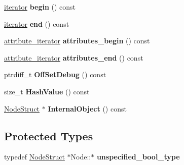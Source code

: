 \begin{DoxyCompactItemize}
\item 
\hypertarget{classphys_1_1xml_1_1Node_a78c82f35dcf7b2c37f1f5ff37d526329}{
\hyperlink{classphys_1_1xml_1_1NodeIterator}{iterator} {\bfseries begin} () const }
\label{d7/d0a/classphys_1_1xml_1_1Node_a78c82f35dcf7b2c37f1f5ff37d526329}

\item 
\hypertarget{classphys_1_1xml_1_1Node_ae69ca8be6e9eb53a4faf8bb50a2996d6}{
\hyperlink{classphys_1_1xml_1_1NodeIterator}{iterator} {\bfseries end} () const }
\label{d7/d0a/classphys_1_1xml_1_1Node_ae69ca8be6e9eb53a4faf8bb50a2996d6}

\item 
\hypertarget{classphys_1_1xml_1_1Node_a601285bed116eb5d63cea9a8d117e5b7}{
\hyperlink{classphys_1_1xml_1_1AttributeIterator}{attribute\_\-iterator} {\bfseries attributes\_\-begin} () const }
\label{d7/d0a/classphys_1_1xml_1_1Node_a601285bed116eb5d63cea9a8d117e5b7}

\item 
\hypertarget{classphys_1_1xml_1_1Node_a9af9e0bff5b8ed06bc40861dccb6b4ec}{
\hyperlink{classphys_1_1xml_1_1AttributeIterator}{attribute\_\-iterator} {\bfseries attributes\_\-end} () const }
\label{d7/d0a/classphys_1_1xml_1_1Node_a9af9e0bff5b8ed06bc40861dccb6b4ec}

\item 
\hypertarget{classphys_1_1xml_1_1Node_a3c29eb5ecbe37642f29ccdd0be3efbe3}{
ptrdiff\_\-t {\bfseries OffSetDebug} () const }
\label{d7/d0a/classphys_1_1xml_1_1Node_a3c29eb5ecbe37642f29ccdd0be3efbe3}

\item 
\hypertarget{classphys_1_1xml_1_1Node_a935f818f5266d68c9d01eab52590f119}{
size\_\-t {\bfseries HashValue} () const }
\label{d7/d0a/classphys_1_1xml_1_1Node_a935f818f5266d68c9d01eab52590f119}

\item 
\hypertarget{classphys_1_1xml_1_1Node_a403f76627bf3bd70b78833ab90340cf6}{
\hyperlink{structphys_1_1xml_1_1NodeStruct}{NodeStruct} $\ast$ {\bfseries InternalObject} () const }
\label{d7/d0a/classphys_1_1xml_1_1Node_a403f76627bf3bd70b78833ab90340cf6}

\end{DoxyCompactItemize}
\subsection*{Protected Types}
\begin{DoxyCompactItemize}
\item 
\hypertarget{classphys_1_1xml_1_1Node_abace2c2c7e70431d920579917417c1e4}{
typedef \hyperlink{structphys_1_1xml_1_1NodeStruct}{NodeStruct} $\ast$Node::$\ast$ {\bfseries unspecified\_\-bool\_\-type}}
\label{d7/d0a/classphys_1_1xml_1_1Node_abace2c2c7e70431d920579917417c1e4}

\end{DoxyCompactItemize}
